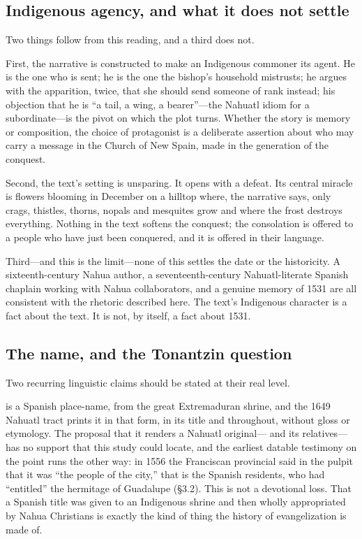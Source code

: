 \subsection{Indigenous agency, and what it does not settle}

Two things follow from this reading, and a third does not.

First, the narrative is constructed to make an Indigenous commoner
its agent. He is the one who is sent; he is the one the bishop's
household mistrusts; he argues with the apparition, twice, that she
should send someone of rank instead; his objection that he is
``a tail, a wing, a bearer''---the Nahuatl idiom for a subordinate---is
the pivot on which the plot turns. Whether the story is memory or
composition, the choice of protagonist is a deliberate assertion
about who may carry a message in the Church of New Spain, made in the
generation of the conquest.

Second, the text's setting is unsparing. It opens with a defeat. Its
central miracle is flowers blooming in December on a hilltop where,
the narrative says, only crags, thistles, thorns, nopals and mesquites
grow and where the frost destroys everything. Nothing in the text
softens the conquest; the consolation is offered to a people who have
just been conquered, and it is offered in their language.

Third---and this is the limit---none of this settles the date or the
historicity. A sixteenth-century Nahua author, a seventeenth-century
Nahuatl-literate Spanish chaplain working with Nahua collaborators,
and a genuine memory of 1531 are all consistent with the rhetoric
described here. The text's Indigenous character is a fact about the
text. It is not, by itself, a fact about 1531.

\subsection{The name, and the Tonantzin question}

Two recurring linguistic claims should be stated at their real level.

 is a Spanish place-name, from the great Extremaduran
shrine, and the 1649 Nahuatl tract prints it in that form, in its
title and throughout, without gloss or etymology. The proposal that
it renders a Nahuatl original--- and its
relatives---has no support that this study could locate, and the
earliest datable testimony on the point runs the other way: in 1556
the Franciscan provincial said in the pulpit that it was ``the people
of the city,'' that is the Spanish residents, who had ``entitled''
the hermitage of Guadalupe (\S3.2). This is not a devotional loss.
That a Spanish title was given to an Indigenous shrine and then
wholly appropriated by Nahua Christians is exactly the kind of thing
the history of evangelization is made of.

